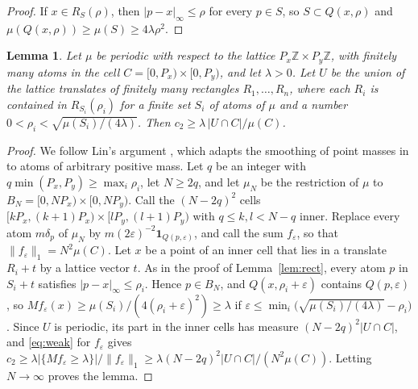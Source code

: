 \documentclass[11pt]{amsart}
\newtheorem{lemma}[equation]{Lemma}
\theoremstyle{definition}
\theoremstyle{remark}
\numberwithin{equation}{section}
\newcommand{\Z}{\mathbb{Z}}
\begin{document}
\begin{proof}
If $x\in R_S(\rho)$, then $|p-x|_\infty\le\rho$ for every $p\in S$, so $S\subset Q(x,\rho)$ and $\mu(Q(x,\rho))\ge\mu(S)\ge4\lambda\rho^2$.
\end{proof}

\begin{lemma}\label{lem:periodic}
Let $\mu$ be periodic with respect to the lattice $P_x\Z\times P_y\Z$, with finitely many atoms in the cell $C=[0,P_x)\times[0,P_y)$, and let $\lambda>0$. Let $U$ be the union of the lattice translates of finitely many rectangles $R_1,\dots,R_n$, where each $R_i$ is contained in $R_{S_i}(\rho_i)$ for a finite set $S_i$ of atoms of $\mu$ and a number $0<\rho_i<\sqrt{\mu(S_i)/(4\lambda)}$. Then $c_2\ge\lambda\,|U\cap C|/\mu(C)$.
\end{lemma}

\begin{proof}
We follow Lin's argument \cite{Lin26b}, which adapts the smoothing of point masses in \cite[Lemma~1.1]{Ald00} to atoms of arbitrary positive mass. Let $q$ be an integer with $q\min(P_x,P_y)\ge\max_i\rho_i$, let $N\ge2q$, and let $\mu_N$ be the restriction of $\mu$ to $B_N=[0,NP_x)\times[0,NP_y)$. Call the $(N-2q)^2$ cells $[kP_x,(k+1)P_x)\times[lP_y,(l+1)P_y)$ with $q\le k,l<N-q$ inner. Replace every atom $m\delta_p$ of $\mu_N$ by $m(2\varepsilon)^{-2}\mathbf 1_{Q(p,\varepsilon)}$, and call the sum $f_\varepsilon$, so that $\|f_\varepsilon\|_1=N^2\mu(C)$. Let $x$ be a point of an inner cell that lies in a translate $R_i+t$ by a lattice vector $t$. As in the proof of Lemma~\ref{lem:rect}, every atom $p$ in $S_i+t$ satisfies $|p-x|_\infty\le\rho_i$. Hence $p\in B_N$, and $Q(x,\rho_i+\varepsilon)$ contains $Q(p,\varepsilon)$, so $Mf_\varepsilon(x)\ge\mu(S_i)/(4(\rho_i+\varepsilon)^2)\ge\lambda$ if $\varepsilon\le\min_i\bigl(\sqrt{\mu(S_i)/(4\lambda)}-\rho_i\bigr)$. Since $U$ is periodic, its part in the inner cells has measure $(N-2q)^2|U\cap C|$, and \eqref{eq:weak} for $f_\varepsilon$ gives $c_2\ge\lambda|\{Mf_\varepsilon\ge\lambda\}|/\|f_\varepsilon\|_1\ge\lambda(N-2q)^2|U\cap C|/(N^2\mu(C))$. Letting $N\to\infty$ proves the lemma.
\end{proof}
\end{document}
